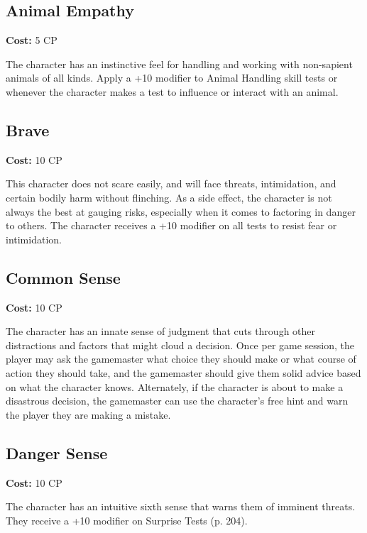 \subsection{Animal Empathy}
\label{sec:traits-animal-empathy}

\textbf{Cost:} 5 CP

The character has an instinctive feel for handling and working with non-sapient animals of all kinds. Apply a +10 modifier to Animal Handling skill tests or whenever the character makes a test to influence or interact with an animal.

\subsection{Brave}
\label{sec:traits-brave}

\textbf{Cost:} 10 CP

This character does not scare easily, and will face threats, intimidation, and certain bodily harm without flinching. As a side effect, the character is not always the best at gauging risks, especially when it comes to factoring in danger to others. The character receives a +10 modifier on all tests to resist fear or intimidation.

\subsection{Common Sense}
\label{sec:traits-common-sense}

\textbf{Cost:} 10 CP

The character has an innate sense of judgment that cuts through other distractions and factors that might cloud a decision. Once per game session, the player may ask the gamemaster what choice they should make or what course of action they should take, and the gamemaster should give them solid advice based on what the character knows. Alternately, if the character is about to make a disastrous decision, the gamemaster can use the character’s free hint and warn the player they are making a mistake.

\subsection{Danger Sense}
\label{sec:traits-danger-sense}

\textbf{Cost:} 10 CP

The character has an intuitive sixth sense that warns them of imminent threats. They receive a +10 modifier on Surprise Tests (p. 204).

